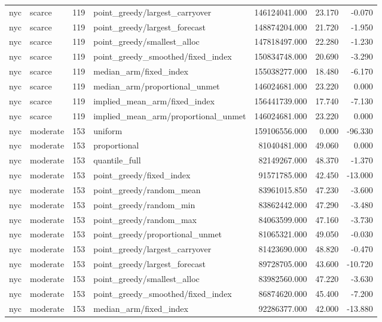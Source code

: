 \begin{tabular}{llrlrrr}
nyc & scarce & 119 & point\_greedy/largest\_carryover & 146124041.000 & 23.170 & -0.070 \\
nyc & scarce & 119 & point\_greedy/largest\_forecast & 148874204.000 & 21.720 & -1.950 \\
nyc & scarce & 119 & point\_greedy/smallest\_alloc & 147818497.000 & 22.280 & -1.230 \\
nyc & scarce & 119 & point\_greedy\_smoothed/fixed\_index & 150834748.000 & 20.690 & -3.290 \\
nyc & scarce & 119 & median\_arm/fixed\_index & 155038277.000 & 18.480 & -6.170 \\
nyc & scarce & 119 & median\_arm/proportional\_unmet & 146024681.000 & 23.220 & 0.000 \\
nyc & scarce & 119 & implied\_mean\_arm/fixed\_index & 156441739.000 & 17.740 & -7.130 \\
nyc & scarce & 119 & implied\_mean\_arm/proportional\_unmet & 146024681.000 & 23.220 & 0.000 \\
nyc & moderate & 153 & uniform & 159106556.000 & 0.000 & -96.330 \\
nyc & moderate & 153 & proportional & 81040481.000 & 49.060 & 0.000 \\
nyc & moderate & 153 & quantile\_full & 82149267.000 & 48.370 & -1.370 \\
nyc & moderate & 153 & point\_greedy/fixed\_index & 91571785.000 & 42.450 & -13.000 \\
nyc & moderate & 153 & point\_greedy/random\_mean & 83961015.850 & 47.230 & -3.600 \\
nyc & moderate & 153 & point\_greedy/random\_min & 83862442.000 & 47.290 & -3.480 \\
nyc & moderate & 153 & point\_greedy/random\_max & 84063599.000 & 47.160 & -3.730 \\
nyc & moderate & 153 & point\_greedy/proportional\_unmet & 81065321.000 & 49.050 & -0.030 \\
nyc & moderate & 153 & point\_greedy/largest\_carryover & 81423690.000 & 48.820 & -0.470 \\
nyc & moderate & 153 & point\_greedy/largest\_forecast & 89728705.000 & 43.600 & -10.720 \\
nyc & moderate & 153 & point\_greedy/smallest\_alloc & 83982560.000 & 47.220 & -3.630 \\
nyc & moderate & 153 & point\_greedy\_smoothed/fixed\_index & 86874620.000 & 45.400 & -7.200 \\
nyc & moderate & 153 & median\_arm/fixed\_index & 92286377.000 & 42.000 & -13.880 \\

\end{tabular}
